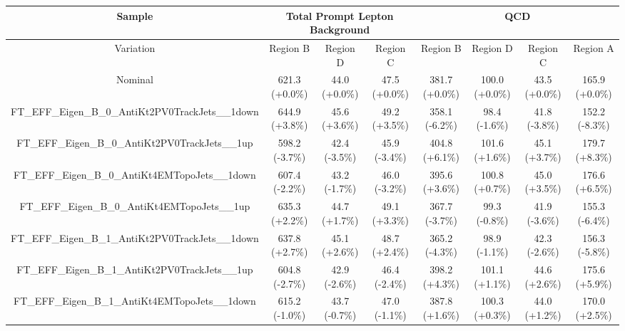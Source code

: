 \begin{table}[htbp!]
\begin{tiny}
\begin{center}
\begin{tabular}{c|c|c|c||c|c|c|c}
Sample                                                          &\multicolumn{3}{c||}{Total Prompt Lepton Background}      &\multicolumn{4}{c}{QCD}                                                  \\
\hline  
Variation                                                       & Region B       & Region D         & Region C           & Region B        & Region D         & Region C          & Region A         \\ 
\hline  
Nominal                                                      & 621.3     (+0.0\%) & 44.0      (+0.0\%) & 47.5      (+0.0\%) & 381.7     (+0.0\%) & 100.0     (+0.0\%) & 43.5      (+0.0\%) & 165.9     (+0.0\%) \\ 
\hline
FT\_EFF\_Eigen\_B\_0\_AntiKt2PV0TrackJets\_\_1down           & 644.9     (+3.8\%) & 45.6      (+3.6\%) & 49.2      (+3.5\%) & 358.1     (-6.2\%) & 98.4      (-1.6\%) & 41.8      (-3.8\%) & 152.2     (-8.3\%) \\ 
FT\_EFF\_Eigen\_B\_0\_AntiKt2PV0TrackJets\_\_1up             & 598.2     (-3.7\%) & 42.4      (-3.5\%) & 45.9      (-3.4\%) & 404.8     (+6.1\%) & 101.6     (+1.6\%) & 45.1      (+3.7\%) & 179.7     (+8.3\%) \\ 
FT\_EFF\_Eigen\_B\_0\_AntiKt4EMTopoJets\_\_1down             & 607.4     (-2.2\%) & 43.2      (-1.7\%) & 46.0      (-3.2\%) & 395.6     (+3.6\%) & 100.8     (+0.7\%) & 45.0      (+3.5\%) & 176.6     (+6.5\%) \\ 
FT\_EFF\_Eigen\_B\_0\_AntiKt4EMTopoJets\_\_1up               & 635.3     (+2.2\%) & 44.7      (+1.7\%) & 49.1      (+3.3\%) & 367.7     (-3.7\%) & 99.3      (-0.8\%) & 41.9      (-3.6\%) & 155.3     (-6.4\%) \\ 
FT\_EFF\_Eigen\_B\_1\_AntiKt2PV0TrackJets\_\_1down           & 637.8     (+2.7\%) & 45.1      (+2.6\%) & 48.7      (+2.4\%) & 365.2     (-4.3\%) & 98.9      (-1.1\%) & 42.3      (-2.6\%) & 156.3     (-5.8\%) \\ 
FT\_EFF\_Eigen\_B\_1\_AntiKt2PV0TrackJets\_\_1up             & 604.8     (-2.7\%) & 42.9      (-2.6\%) & 46.4      (-2.4\%) & 398.2     (+4.3\%) & 101.1     (+1.1\%) & 44.6      (+2.6\%) & 175.6     (+5.9\%) \\ 
FT\_EFF\_Eigen\_B\_1\_AntiKt4EMTopoJets\_\_1down             & 615.2     (-1.0\%) & 43.7      (-0.7\%) & 47.0      (-1.1\%) & 387.8     (+1.6\%) & 100.3     (+0.3\%) & 44.0      (+1.2\%) & 170.0     (+2.5\%) \\ 

\end{tabular}
\end{center}
\end{tiny}
\end{table}
